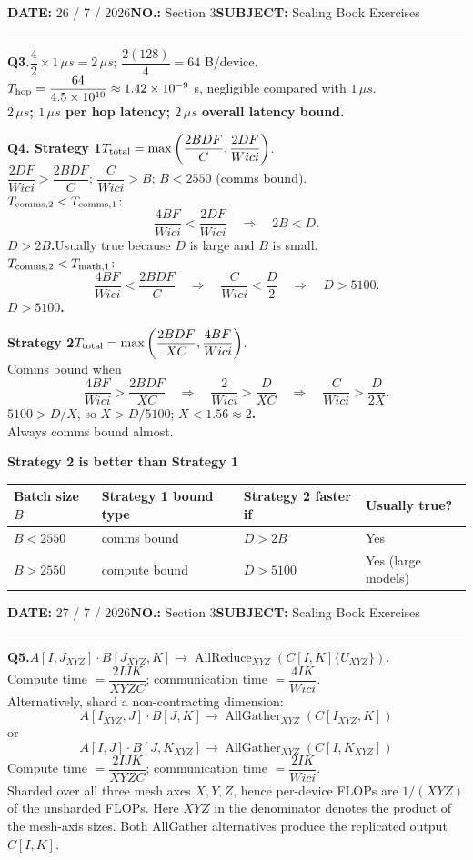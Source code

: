 \documentclass[10pt]{article}
\newcommand{\note}[1]{\textcolor{blue!55!black}{#1}}
\newcommand{\answer}[1]{\textcolor{blue!65!black}{\textbf{#1}}}
\newcommand{\question}[1]{\par\vspace{0.9em}\noindent\textbf{#1}\quad}
\newcommand{\meta}[2]{\textbf{#1} #2\hspace{2.5em}}
\newcommand{\allreduce}{\operatorname{AllReduce}}
\newcommand{\allgather}{\operatorname{AllGather}}
\newcommand{\pagehead}[2]{%
 {\small\meta{DATE:}{#1}\meta{NO.:}{#2}\meta{SUBJECT:}{Scaling Book Exercises}}\par\vspace{0.8em}\hrule\vspace{0.8em}}
\begin{document}
\newpage
\pagehead{26 / 7 / 2026}{Section 3}
\question{Q3.}$\dfrac{4}{2}\times1\,\mu s=2\,\mu s$; $\dfrac{2(128)}{4}=64$ B/device.\\
$T_{\rm hop}=\dfrac{64}{4.5\times10^{10}}\approx1.42\times10^{-9}$ s, negligible compared with $1\,\mu s$.\\
\answer{$2\,\mu s$; $1\,\mu s$ per hop latency; $2\,\mu s$ overall latency bound.}

\question{Q4. Strategy 1}$T_{\rm total}=\max\left(\dfrac{2BDF}{C},\dfrac{2DF}{Wici}\right)$.\\
$\dfrac{2DF}{Wici}>\dfrac{2BDF}{C}$; $\dfrac{C}{Wici}>B$; \answer{$B<2550$} (comms bound).\\
$T_{\rm comms,2}<T_{\rm comms,1}$:
\[
\dfrac{4BF}{Wici}<\dfrac{2DF}{Wici}
\quad\Longrightarrow\quad 2B<D.
\]
\answer{$D>2B$.}\quad Usually true because $D$ is large and $B$ is small.\\
$T_{\rm comms,2}<T_{\rm math,1}$:
\[
\dfrac{4BF}{Wici}<\dfrac{2BDF}{C}
\quad\Longrightarrow\quad \dfrac{C}{Wici}<\dfrac{D}{2}
\quad\Longrightarrow\quad D>5100.
\]
\answer{$D>5100$.}

\question{Strategy 2}$T_{\rm total}=\max\left(\dfrac{2BDF}{XC},\dfrac{4BF}{Wici}\right)$.\\
Comms bound when
\[
\dfrac{4BF}{Wici}>\dfrac{2BDF}{XC}
\quad\Longrightarrow\quad \dfrac{2}{Wici}>\dfrac{D}{XC}
\quad\Longrightarrow\quad \dfrac{C}{Wici}>\dfrac{D}{2X}.
\]
$5100>D/X$, so $X>D/5100$; \answer{$X<1.56\approx2$.}\\
\note{Always comms bound almost.}

\begin{center}\answer{Strategy 2 is better than Strategy 1}\end{center}
\begin{center}\begin{tabular}{llll}\toprule
Batch size $B$ & Strategy 1 bound type & Strategy 2 faster if & Usually true?\\\midrule
$B<2550$ & comms bound & $D>2B$ & Yes\\
$B>2550$ & compute bound & $D>5100$ & Yes (large models)\\\bottomrule
\end{tabular}\end{center}

\newpage
\pagehead{27 / 7 / 2026}{Section 3}
\question{Q5.}$A[I,J_{XYZ}]\cdot B[J_{XYZ},K]\to\allreduce_{XYZ}(C[I,K]\{U_{XYZ}\})$.\\
Compute time $=\dfrac{2IJK}{XYZC}$; communication time $=\dfrac{4IK}{Wici}$.\\
Alternatively, shard a non-contracting dimension:
\[
A[I_{XYZ},J]\cdot B[J,K]\to\allgather_{XYZ}(C[I_{XYZ},K])
\]
or
\[
\boxed{A[I,J]\cdot B[J,K_{XYZ}]\to\allgather_{XYZ}(C[I,K_{XYZ}])}
\]
Compute time $=\dfrac{2IJK}{XYZC}$; communication time $=\dfrac{2IK}{Wici}$.\\
\note{Sharded over all three mesh axes $X,Y,Z$, hence per-device FLOPs are $1/(XYZ)$ of the unsharded FLOPs. Here $XYZ$ in the denominator denotes the product of the mesh-axis sizes. Both AllGather alternatives produce the replicated output $C[I,K]$.}
\end{document}
